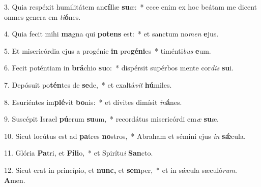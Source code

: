 \item 3. Quia respéxit humilitátem an\textbf{cíl}læ \textbf{su}æ:~* ecce enim ex hoc beátam me dicent omnes genera em \textit{ti}\textbf{ó}nes.

\item 4. Quia fecit mihi \textbf{ma}gna qui \textbf{pot}\textbf{ens} est:~* et sanctum no\textit{men} \textbf{e}jus.

\item 5. Et misericórdia ejus a progénie \textbf{in} pro\textbf{gé}\textbf{ni}es~* timénti\textit{bus} \textbf{e}um.

\item 6. Fecit poténtiam in \textbf{brá}chio \textbf{su}o:~* dispérsit supérbos mente cor\textit{dis} \textbf{su}i.

\item 7. Depósuit po\textbf{tén}tes de \textbf{se}de,~* et exaltá\textit{vit} \textbf{hú}miles.

\item 8. Esuriéntes im\textbf{plé}vit \textbf{bo}nis:~* et dívites dimísit \textit{in}\textbf{á}nes.

\item 9. Suscépit Israel \textbf{pú}erum \textbf{su}um,~* recordátus misericórdi em\textit{æ} \textbf{su}æ.

\item 10. Sicut locútus est ad \textbf{pa}tres \textbf{no}stros,~* Abraham et sémini ejus \textit{in} \textbf{sǽ}cula.

\item 11. Glória \textbf{Pa}tri, et \textbf{Fí}\textbf{li}o,~* et Spirítu\textit{i} \textbf{San}cto.

\item 12. Sicut erat in princípio, et \textbf{nunc,} et \textbf{sem}per,~* et in sǽcula sæculó\textit{rum}. \textbf{A}men.

